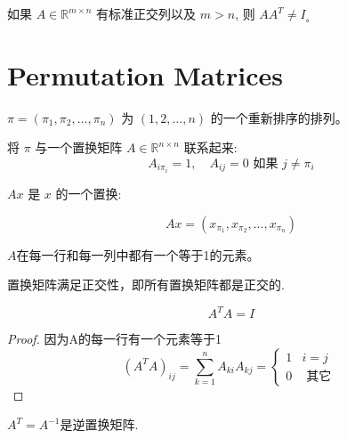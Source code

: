 \begin{remark}
    如果 $ A \in \mathbb{R}^{m \times n} $ 有标准正交列以及 $ m>n $, 则 $ A A^{T} \neq I_{\text {。 }} $
\end{remark}

\section{Permutation Matrices}

\begin{notation}
    $ \pi=\left(\pi_{1}, \pi_{2}, \ldots, \pi_{n}\right) $ 为 $ (1,2, \ldots, n) $ 的一个重新排序的排列。

    将 $ \pi $ 与一个置换矩阵 $ A \in \mathbb{R}^{n \times n} $ 联系起来:
$$
A_{i \pi_{i}}=1, \quad A_{i j}=0 \text { 如果 } j \neq \pi_{i}
$$
\end{notation}

\begin{definition}[置换]
    $ A x $ 是 $ x $ 的一个置换:
    
    $$ A x=\left(x_{\pi_{1}}, x_{\pi_{2}}, \ldots, x_{\pi_{n}}\right) $$
\end{definition}

$A$在每一行和每一列中都有一个等于1的元素。

\begin{theorem}
    置换矩阵满足正交性，即所有置换矩阵都是正交的.
\end{theorem}

\begin{corollary}
    $$ A^{T} A=I $$
\end{corollary}

\begin{proof}
    因为A的每一行有一个元素等于1
$$
\left(A^{T} A\right)_{i j}=\sum_{k=1}^{n} A_{k i} A_{k j}=\left\{\begin{array}{ll}
1 & i=j \\
0 & \text { 其它 }
\end{array}\right.
$$
\end{proof}

\begin{corollary}
    $ A^{T}=A^{-1} $是逆置换矩阵.
\end{corollary}

